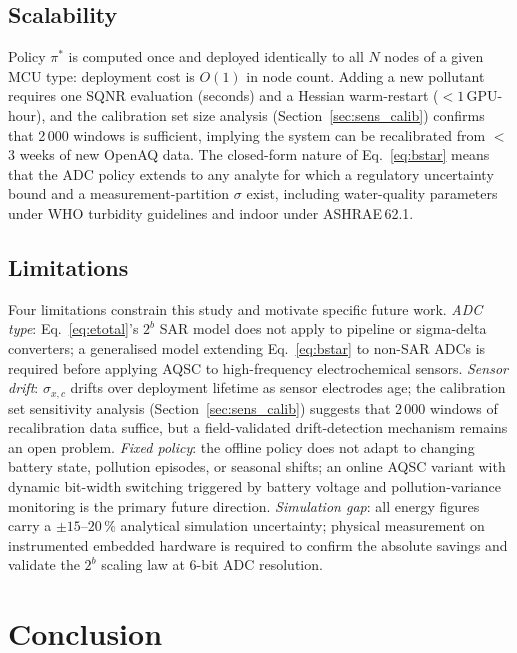 \documentclass[12pt,a4paper]{article}
\begin{document}
\subsection{Scalability}
\label{sec:disc_scale}

Policy $\pi^*$ is computed once and deployed identically to all $N$
nodes of a given MCU type: deployment cost is $O(1)$ in node count.
Adding a new pollutant requires one SQNR evaluation (seconds) and a
Hessian warm-restart ($<1$\,GPU-hour), and the calibration
set size analysis (Section~\ref{sec:sens_calib}) confirms that
2\,000 windows is sufficient, implying the system can be recalibrated
from $<$\,3 weeks of new OpenAQ data.
The closed-form nature of Eq.~\eqref{eq:bstar} means that the
ADC policy extends to any analyte for which a regulatory uncertainty
bound and a measurement-partition $\sigma$ exist, including
water-quality parameters under WHO turbidity guidelines and
indoor  under ASHRAE\,62.1.

\subsection{Limitations}
\label{sec:disc_limits}

Four limitations constrain this study and motivate specific future work.
\textit{ADC type}: Eq.~\eqref{eq:etotal}'s $2^b$ SAR model does not
apply to pipeline or sigma-delta converters; a generalised model
extending Eq.~\eqref{eq:bstar} to non-SAR ADCs is required before
applying AQSC to high-frequency electrochemical sensors.
\textit{Sensor drift}: $\sigma_{x,c}$ drifts over deployment lifetime
as sensor electrodes age; the calibration set sensitivity analysis
(Section~\ref{sec:sens_calib}) suggests that 2\,000 windows of
recalibration data suffice, but a field-validated drift-detection
mechanism remains an open problem.
\textit{Fixed policy}: the offline policy does not adapt to changing
battery state, pollution episodes, or seasonal shifts; an online
AQSC variant with dynamic bit-width switching triggered by battery
voltage and pollution-variance monitoring is the primary future direction.
\textit{Simulation gap}: all energy figures carry a $\pm15$--$20\,\%$
analytical simulation uncertainty; physical measurement on
instrumented embedded hardware is required to confirm the absolute
savings and validate the $2^b$ scaling law at 6-bit ADC resolution.

\section{Conclusion}
\label{sec:conclusion}
\end{document}
